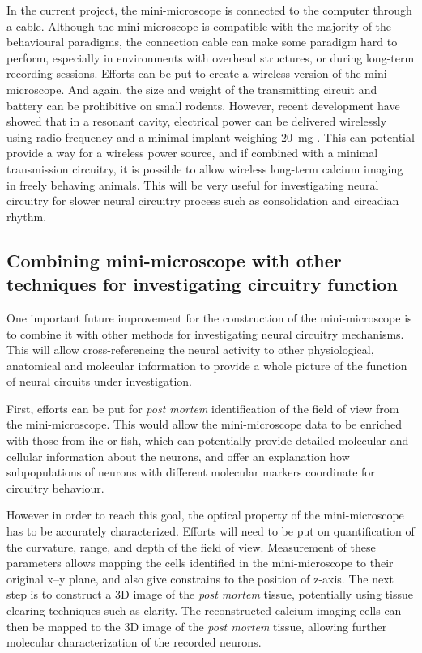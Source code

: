 In the current project, the mini-microscope is connected to the computer through a cable. Although the mini-microscope is compatible with the majority of the behavioural paradigms, the connection cable can make some paradigm hard to perform, especially in environments with overhead structures, or during long-term recording sessions. Efforts can be put to create a wireless version of the mini-microscope. And again, the size and weight of the transmitting circuit and battery can be prohibitive on small rodents. However, recent development have showed that in a resonant cavity, electrical power can be delivered wirelessly using radio frequency and a minimal implant weighing \SI{20}{\mg} \citep{montgomery15}. This can potential provide a way for a wireless power source, and if combined with a minimal transmission circuitry, it is possible to allow wireless long-term calcium imaging in freely behaving animals. This will be very useful for investigating neural circuitry for slower neural circuitry process such as consolidation and circadian rhythm. 

\subsection{Combining mini-microscope with other techniques for investigating circuitry function}

One important future improvement for the construction of the mini-microscope is to combine it with other methods for investigating neural circuitry mechanisms. This will allow cross-referencing the neural activity to other physiological, anatomical and molecular information to provide a whole picture of the function of neural circuits under investigation. 

First, efforts can be put for \textit{post mortem} identification of the field of view from the mini-microscope. This would allow the mini-microscope data to be enriched with those from \gls{ihc} or \gls{fish}, which can potentially provide detailed molecular and cellular information about the neurons, and offer an explanation how subpopulations of neurons with different molecular markers coordinate for circuitry behaviour. 

However in order to reach this goal, the optical property of the mini-microscope has to be accurately characterized. Efforts will need to be put on quantification of the curvature, range, and depth of the field of view. Measurement of these parameters allows mapping the cells identified in the mini-microscope to their original x--y plane, and also give constrains to the position of z-axis. The next step is to construct a 3D image of the \textit{post mortem} tissue, potentially using tissue clearing techniques such as \gls{clarity}. The reconstructed calcium imaging cells can then be mapped to the 3D image of the \textit{post mortem} tissue, allowing further molecular characterization of the recorded neurons. 

